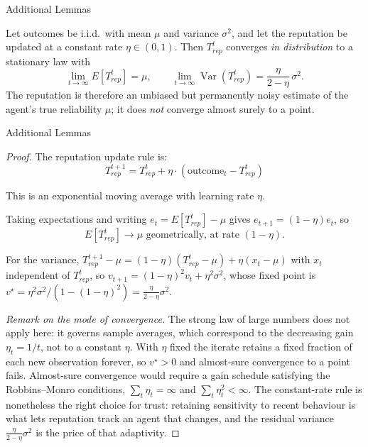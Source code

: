 \documentclass[
  ignorenonframetext,
]{beamer}
\newcounter{none} %
\begin{document}
\begin{frame}[allowframebreaks]{Additional Lemmas}
\begin{lemma}
\label{lem:trust-convergence}
Let outcomes be i.i.d.\ with mean $\mu$ and variance $\sigma^2$, and let the
reputation be updated at a constant rate $\eta \in (0,1)$. Then $T_{rep}^t$
converges \emph{in distribution} to a stationary law with
\begin{equation}
\label{eq:trust-convergence}
\lim_{t \to \infty} E[T_{rep}^t] = \mu,
\qquad
\lim_{t \to \infty} \operatorname{Var}(T_{rep}^t) = \frac{\eta}{2 - \eta}\,\sigma^2 .
\end{equation}
The reputation is therefore an unbiased but permanently noisy estimate of the
agent's true reliability $\mu$; it does \emph{not} converge almost surely to a
point.
\end{lemma}

\end{frame}

\begin{frame}[allowframebreaks]{Additional Lemmas}
\begin{proof}
The reputation update rule is:
\begin{equation}
\label{eq:reputation-update}
T_{rep}^{t+1} = T_{rep}^t + \eta \cdot (\text{outcome}_t - T_{rep}^t)
\end{equation}

This is an exponential moving average with learning rate $\eta$.

Taking expectations and writing $e_t = E[T_{rep}^t] - \mu$ gives
$e_{t+1} = (1 - \eta) e_t$, so
\begin{equation}
\label{eq:convergence-limit}
E[T_{rep}^t] \to \mu \text{ geometrically, at rate } (1 - \eta).
\end{equation}

For the variance, $T_{rep}^{t+1} - \mu = (1-\eta)(T_{rep}^t - \mu) + \eta(x_t - \mu)$
with $x_t$ independent of $T_{rep}^t$, so
$v_{t+1} = (1-\eta)^2 v_t + \eta^2 \sigma^2$, whose fixed point is
$v^\star = \eta^2\sigma^2 / (1 - (1-\eta)^2) = \frac{\eta}{2-\eta}\sigma^2$.

\emph{Remark on the mode of convergence.} The strong law of large numbers does
not apply here: it governs sample averages, which correspond to the decreasing
gain $\eta_t = 1/t$, not to a constant $\eta$. With $\eta$ fixed the iterate
retains a fixed fraction of each new observation forever, so $v^\star > 0$ and
almost-sure convergence to a point fails. Almost-sure convergence would require
a gain schedule satisfying the Robbins--Monro conditions,
$\sum_t \eta_t = \infty$ and $\sum_t \eta_t^2 < \infty$. The constant-rate rule
is nonetheless the right choice for trust: retaining sensitivity to recent
behaviour is what lets reputation track an agent that changes, and the residual
variance $\frac{\eta}{2-\eta}\sigma^2$ is the price of that adaptivity.
\end{proof}
\end{frame}
\end{document}
